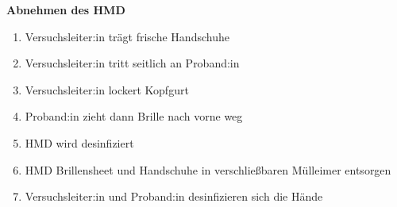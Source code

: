\documentclass[24pt, a4paper, portrait]{article}
\begin{document}
\Large
\textbf{Abnehmen des HMD}

\large

\begin{enumerate}
    \item Versuchsleiter:in trägt frische Handschuhe
    \item Versuchsleiter:in tritt seitlich an Proband:in
    \item Versuchsleiter:in lockert Kopfgurt
    \item Proband:in zieht dann Brille nach vorne weg
    \item HMD wird desinfiziert
    \item HMD Brillensheet und Handschuhe in verschließbaren Mülleimer entsorgen
    \item Versuchsleiter:in und Proband:in desinfizieren sich die Hände
\end{enumerate}
\end{document}
